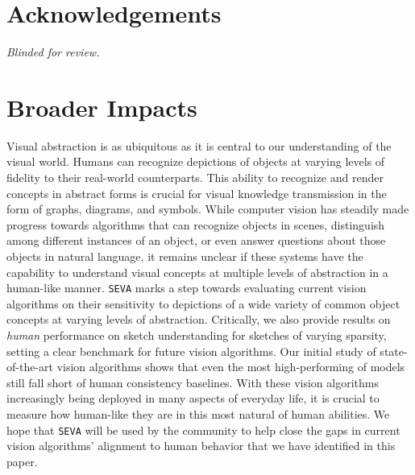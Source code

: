\documentclass{article}
\begin{document}
\section*{Acknowledgements}
\textit{Blinded for review.}
\section*{Broader Impacts}

Visual abstraction is as ubiquitous as it is central to our understanding of the visual world.
Humans can recognize depictions of objects at varying levels of fidelity to their real-world counterparts. 
This ability to recognize and render concepts in abstract forms is crucial for visual knowledge transmission in the form of graphs, diagrams, and symbols.
While computer vision has steadily made progress towards algorithms that can recognize objects in scenes, distinguish among different instances of an object, or even answer questions about those objects in natural language, it remains unclear if these systems have the capability to understand visual concepts at multiple levels of abstraction in a human-like manner.
\texttt{SEVA} marks a step towards evaluating current vision algorithms on their sensitivity to depictions of a wide variety of common object concepts at varying levels of abstraction.
Critically, we also provide results on \textit{human} performance on sketch understanding for sketches of varying sparsity, setting a clear benchmark for future vision algorithms.
Our initial study of state-of-the-art vision algorithms shows that even the most high-performing of models still fall short of human consistency baselines.
With these vision algorithms increasingly being deployed in many aspects of everyday life, it is crucial to measure how human-like they are in this most natural of human abilities. 
We hope that \texttt{SEVA} will be used by the community to help close the gaps in current vision algorithms' alignment to human behavior that we have identified in this paper.
\end{document}
